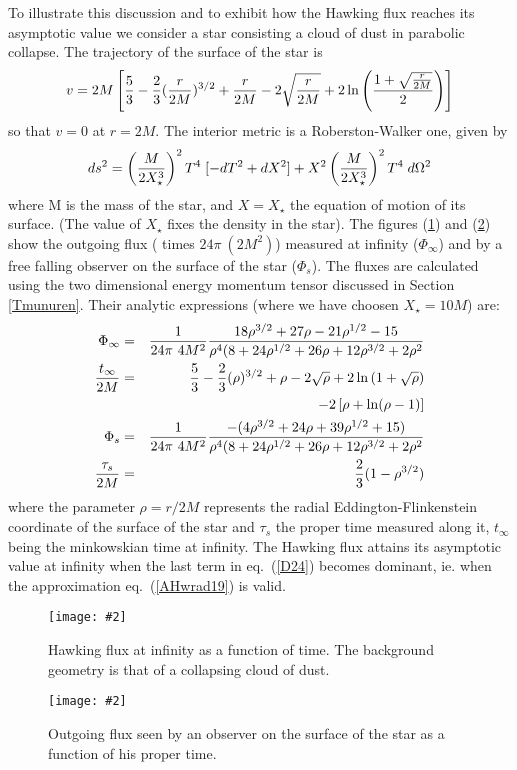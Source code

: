 \documentclass[12pt,oneside]{report}
\newcommand{\dessin}[4]
{\begin{figure}[tp]\begin{center}
\texttt{[image: \#2]}%
\end{center}
\caption{#4}
\label{#3}
\end{figure}}
\def\beq {\begin{equation}}
\def\feq {\end{equation}}
\def\beqa {\begin{eqnarray}}
\def\feqa {\end{eqnarray}}
\begin{document}
To illustrate this discussion and to exhibit how the Hawking flux reaches 
its asymptotic value we consider a star consisting
 a cloud of dust in parabolic collapse. The trajectory of the
surface of the star is 
\beq  v = 2 M \left[ {5 \over 3} - {2 \over 3} ({r \over 2M})^
{3/2} + { r \over 2 M} - 2 \sqrt {{r \over 2M}} + 2 \ln \left (
{1 + \sqrt {{r \over 2 M}} \over 2} \right) \right] \nonumber \feq
\noindent so that  $v = 0$ at $r = 2M$. The interior metric is a
Roberston-Walker one, given by
\beq  
d s^2 = \left( {M\over 2 X _{\star}^3} \right)^2
T^4 \; [ - d T^2 + d X^2 ] + X^2 \left({ M \over 2 X
_{\star}^3} \right)^2 T^4 \; d \Omega^2 \nonumber 
\feq
\noindent where M is the mass of the star, and $  X =
X_{\star}$ the equation of motion of its surface. (The value of
$  X_{\star}$ fixes the density in the star). The figures (\ref{fluxinf}) and (\ref{fluxsurf}) show the outgoing flux  
( times $ 24 \pi \ (2M^2)$) measured at infinity ($\Phi_{\infty}$) and
by  a free falling observer on the surface of the star ($\Phi_{s}$).
The fluxes are calculated using the two dimensional energy momentum 
tensor discussed in Section \ref{Tmunuren}.
Their 
analytic expressions (where we have choosen $ X_{\star} = 10M$) are:
\beqa
\Phi_{\infty}&=&{1\over {24\pi\ 4M^2}}{{18{\rho}^{3/2}+27{\rho}-21{\rho}^{1/2}
-15}\over{{\rho}^4(8+24{\rho}^{1/2}
+26{\rho}+12{\rho}^{3/2}+2{\rho}^2}}\\
{{t_{\infty}}\over {2M}}&=& {5 \over 3} - {2 \over 3} (\rho)^
{3/2} + {\rho} - 2 \sqrt {\rho} + 2 \ln \left(
{1 + \sqrt {{\rho}} } \right)\nonumber\\
& &-2\left[\rho+\ln(\rho-1)\right]\label{D24}\\
\Phi_{s}&=&{1\over
{24\pi\
4M^2}}{{-(4{\rho}^{3/2}+24{\rho}+39{\rho}^{1/2}+15)}\over{{\rho}^4(8+24{\rho}^{1/2}
+26{\rho}+12{\rho}^{3/2}+2{\rho}^2}}\\  
{{\tau_{s}} \over {2M}}&=&{2\over 3}(1-\rho^{3/2})
\feqa
where the parameter $\rho=r/2M$ represents the radial Eddington-Flinkenstein
coordinate of the surface of the star and $\tau_{s}$ the proper time measured
along it, $t_{\infty}$ being the minkowskian time at infinity.
The Hawking flux attains its asymptotic value at infinity when the last term 
in eq.~(\ref{D24}) becomes dominant, ie. when the approximation 
eq.~(\ref{AHwrad19}) is
valid.


\dessin{1.000}{NFIGD1.eps}{fluxinf}{Hawking flux at infinity as a function of time. 
The background geometry
is that of a collapsing cloud of dust.}
\dessin{1.000}{NFIGD2.eps}{fluxsurf}{Outgoing flux seen by an observer 
on the surface of the star as a function of
his proper time.}
\end{document}
